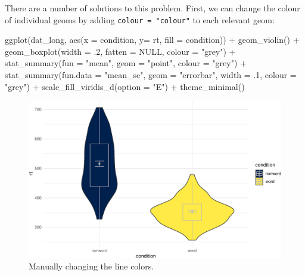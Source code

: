 \documentclass[
  english,
  doc,floatsintext]{apa6}
\newenvironment{Shaded}{\begin{snugshade}}{\end{snugshade}}
\newcommand{\AttributeTok}[1]{\textcolor[rgb]{0.77,0.63,0.00}{#1}}
\newcommand{\ConstantTok}[1]{\textcolor[rgb]{0.00,0.00,0.00}{#1}}
\newcommand{\DecValTok}[1]{\textcolor[rgb]{0.00,0.00,0.81}{#1}}
\newcommand{\FunctionTok}[1]{\textcolor[rgb]{0.00,0.00,0.00}{#1}}
\newcommand{\NormalTok}[1]{#1}
\newcommand{\SpecialCharTok}[1]{\textcolor[rgb]{0.00,0.00,0.00}{#1}}
\newcommand{\StringTok}[1]{\textcolor[rgb]{0.31,0.60,0.02}{#1}}
\begin{document}
There are a number of solutions to this problem. First, we can change the colour of individual geoms by adding \texttt{colour\ =\ "colour"} to each relevant geom:

\begin{Shaded}
\begin{Highlighting}[]
\FunctionTok{ggplot}\NormalTok{(dat\_long, }\FunctionTok{aes}\NormalTok{(}\AttributeTok{x =}\NormalTok{ condition, }\AttributeTok{y=}\NormalTok{ rt, }\AttributeTok{fill =}\NormalTok{ condition)) }\SpecialCharTok{+}
  \FunctionTok{geom\_violin}\NormalTok{() }\SpecialCharTok{+}
  \FunctionTok{geom\_boxplot}\NormalTok{(}\AttributeTok{width =}\NormalTok{ .}\DecValTok{2}\NormalTok{, }\AttributeTok{fatten =} \ConstantTok{NULL}\NormalTok{, }\AttributeTok{colour =} \StringTok{"grey"}\NormalTok{) }\SpecialCharTok{+}
  \FunctionTok{stat\_summary}\NormalTok{(}\AttributeTok{fun =} \StringTok{"mean"}\NormalTok{, }\AttributeTok{geom =} \StringTok{"point"}\NormalTok{, }\AttributeTok{colour =} \StringTok{"grey"}\NormalTok{) }\SpecialCharTok{+}
  \FunctionTok{stat\_summary}\NormalTok{(}\AttributeTok{fun.data =} \StringTok{"mean\_se"}\NormalTok{, }\AttributeTok{geom =} \StringTok{"errorbar"}\NormalTok{, }\AttributeTok{width =}\NormalTok{ .}\DecValTok{1}\NormalTok{, }\AttributeTok{colour =} \StringTok{"grey"}\NormalTok{) }\SpecialCharTok{+}
  \FunctionTok{scale\_fill\_viridis\_d}\NormalTok{(}\AttributeTok{option =} \StringTok{"E"}\NormalTok{) }\SpecialCharTok{+}
  \FunctionTok{theme\_minimal}\NormalTok{()}
\end{Highlighting}
\end{Shaded}

\begin{figure}

{\centering \includegraphics[width=1\linewidth]{images/viobox5-1} 

}

\caption{Manually changing the line colors.}\label{fig:viobox5}
\end{figure}
\end{document}
